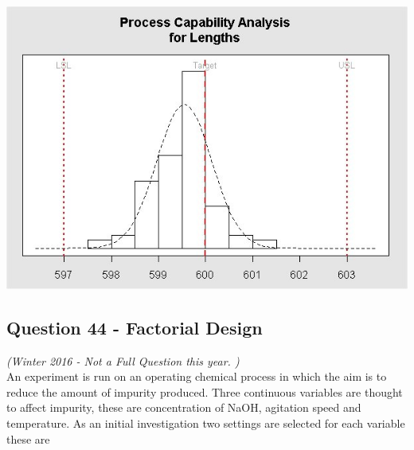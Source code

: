 \documentclass[a4paper,12pt]{article}
\begin{document}
\begin{center}
	\includegraphics[scale=0.55]{images/ExamQ4hist}
\end{center}
\newpage
%
%
%
\subsection*{Question 44 - Factorial Design}
\textit{(Winter 2016 - Not a Full Question this year. )}\\
An experiment is run on an operating chemical process in which the aim is to reduce the
amount of impurity produced. Three continuous variables are thought to affect impurity,
these are concentration of NaOH, agitation speed and temperature. As an initial investigation two settings are selected for each variable these are
\end{document}
